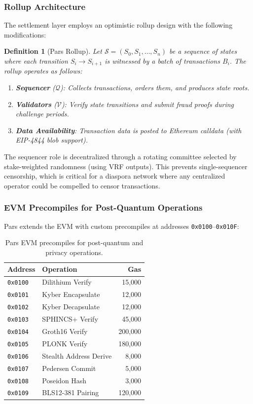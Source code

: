 \documentclass[11pt,a4paper,twocolumn]{article}
\newtheorem{definition}[theorem]{Definition}
\begin{document}
\subsubsection{Rollup Architecture}

The settlement layer employs an optimistic rollup design with the following modifications:

\begin{definition}[Pars Rollup]
Let $\mathcal{S} = (S_0, S_1, \ldots, S_n)$ be a sequence of states where each transition $S_i \to S_{i+1}$ is witnessed by a batch of transactions $B_i$. The rollup operates as follows:
\begin{enumerate}
  \item \textbf{Sequencer} ($\mathcal{Q}$): Collects transactions, orders them, and produces state roots.
  \item \textbf{Validators} ($\mathcal{V}$): Verify state transitions and submit fraud proofs during challenge periods.
  \item \textbf{Data Availability}: Transaction data is posted to Ethereum calldata (with EIP-4844 blob support).
\end{enumerate}
\end{definition}

The sequencer role is decentralized through a rotating committee selected by stake-weighted randomness (using VRF outputs). This prevents single-sequencer censorship, which is critical for a diaspora network where any centralized operator could be compelled to censor transactions.

\subsubsection{EVM Precompiles for Post-Quantum Operations}

Pars extends the EVM with custom precompiles at addresses \texttt{0x0100}--\texttt{0x010F}:

\begin{table}[H]
\centering
\caption{Pars EVM precompiles for post-quantum and privacy operations.}
\label{tab:precompiles}
\begin{tabularx}{\columnwidth}{lXr}
\toprule
\textbf{Address} & \textbf{Operation} & \textbf{Gas} \\
\midrule
\texttt{0x0100} & Dilithium Verify & 15,000 \\
\texttt{0x0101} & Kyber Encapsulate & 12,000 \\
\texttt{0x0102} & Kyber Decapsulate & 12,000 \\
\texttt{0x0103} & SPHINCS+ Verify & 45,000 \\
\texttt{0x0104} & Groth16 Verify & 200,000 \\
\texttt{0x0105} & PLONK Verify & 180,000 \\
\texttt{0x0106} & Stealth Address Derive & 8,000 \\
\texttt{0x0107} & Pedersen Commit & 5,000 \\
\texttt{0x0108} & Poseidon Hash & 3,000 \\
\texttt{0x0109} & BLS12-381 Pairing & 120,000 \\
\bottomrule
\end{tabularx}
\end{table}
\end{document}
